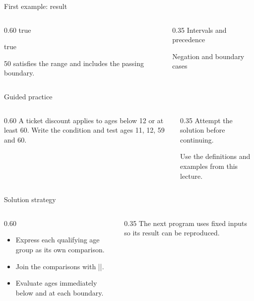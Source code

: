 \documentclass[10pt,aspectratio=169]{beamer}
\begin{document}
\begin{frame}[fragile,t]{First example: result}
\begin{columns}[T,onlytextwidth]\begin{column}{0.60\textwidth}
true\par true\par 50 satisfies the range and includes the passing boundary.
\end{column}\begin{column}{0.35\textwidth}\small
Intervals and precedence

Negation and boundary cases
\end{column}\end{columns}
\end{frame}

\begin{frame}[fragile,t]{Guided practice}
\begin{columns}[T,onlytextwidth]\begin{column}{0.60\textwidth}
A ticket discount applies to ages below 12 or at least 60. Write the condition and test ages 11, 12, 59 and 60.
\end{column}\begin{column}{0.35\textwidth}\small
Attempt the solution before continuing.

Use the definitions and examples from this lecture.
\end{column}\end{columns}
\end{frame}

\begin{frame}[fragile,t]{Solution strategy}
\begin{columns}[T,onlytextwidth]\begin{column}{0.60\textwidth}
\begin{itemize}
\item Express each qualifying age group as its own comparison.
\item Join the comparisons with ||.
\item Evaluate ages immediately below and at each boundary.
\end{itemize}
\end{column}\begin{column}{0.35\textwidth}\small
The next program uses fixed inputs so its result can be reproduced.
\end{column}\end{columns}
\end{frame}
\end{document}
